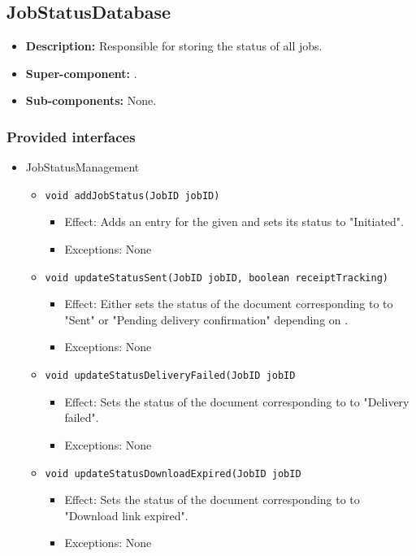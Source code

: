 \subsection{JobStatusDatabase}
\begin{itemize}
    \item \textbf{Description:} Responsible for storing the status of all jobs.
    \item \textbf{Super-component:} .
    \item \textbf{Sub-components:} None.
\end{itemize}

\subsubsection*{Provided interfaces}
\begin{itemize}
    \item JobStatusManagement
    \begin{itemize}
		\item \texttt{void addJobStatus(JobID jobID)}
		\begin{itemize}
            \item Effect: Adds an entry for the given  and sets its status to "Initiated".
            \item Exceptions: None
        \end{itemize}

		\item \texttt{void updateStatusSent(JobID jobID, boolean receiptTracking)}
		\begin{itemize}
            \item Effect: Either sets the status of the document corresponding to  to "Sent" or "Pending delivery confirmation" depending on .
            \item Exceptions: None
        \end{itemize}

		\item \texttt{void updateStatusDeliveryFailed(JobID jobID}
		\begin{itemize}
            \item Effect: Sets the status of the document corresponding to  to "Delivery failed".
            \item Exceptions: None
        \end{itemize}

		\item \texttt{void updateStatusDownloadExpired(JobID jobID}
		\begin{itemize}
            \item Effect: Sets the status of the document corresponding to  to "Download link expired".
            \item Exceptions: None
        \end{itemize}


\end{itemize}
\end{itemize}
